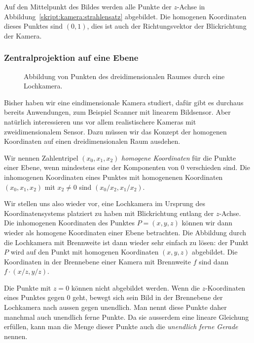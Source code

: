 Auf den Mittelpunkt des Bildes werden alle Punkte der $z$-Achse
in Abbildung~\ref{skript:kamera:strahlensatz} abgebildet.
Die homogenen Koordinaten dieses Punktes sind $(0,1)$, dies ist
auch der Richtungsvektor der Blickrichtung der Kamera.

\subsubsection{Zentralprojektion auf eine Ebene}
\begin{figure}
\centering
\caption{Abbildung von Punkten des dreidimensionalen Raumes durch eine
Lochkamera.
\label{skript:kamera:lochkamera}}
\end{figure}
Bisher haben wir eine eindimensionale Kamera studiert, dafür gibt
es durchaus bereits Anwendungen, zum Beispiel Scanner mit linearem
Bildsensor.
Aber natürlich
interessieren uns vor allem realistischere Kameras mit zweidimensionalem
Sensor.
Dazu müssen wir das Konzept der homogenen Koordinaten auf einen
dreidimensionalen Raum ausdehen.

\begin{definition}
Wir nennen Zahlentripel $(x_0,x_1,x_2)$ {\em homogene Koordinaten}
für die Punkte einer Ebene, wenn mindestens eine der Komponenten von $0$
verschieden sind.
Die inhomogenen Koordinaten eines Punktes mit homogenenen Koordinaten
$(x_0,x_1,x_2)$ mit $x_2\ne 0$ sind $(x_0/x_2,x_1/x_2)$.
\end{definition}

Wir stellen uns also wieder vor, eine Lochkamera im Ursprung des
Koordinatensystems platziert zu haben mit Blickrichtung entlang der
$z$-Achse.
Die inhomogenen Koordinaten des Punktes $P=(x,y,z)$ können wir dann
wieder als homogene Koordinaten einer Ebene betrachten.
Die Abbildung durch die Lochkamera mit Brennweite ist dann wieder sehr
einfach zu lösen: der Punkt $P$ wird auf den Punkt mit homogenen Koordinaten
$(x,y,z)$ abgebildet.
Die Koordinaten in der Brennebene einer Kamera mit Brennweite $f$ sind dann
$f\cdot (x/z, y/z)$.

Die Punkte mit $z=0$ können nicht abgebildet werden.
Wenn die $z$-Koordinaten eines Punktes gegen $0$ geht, bewegt sich sein
Bild in der Brennebene der Lochkamera nach aussen gegen unendlich.
Man nennt diese Punkte daher manchmal auch unendlich ferne Punkte.
Da sie ausserdem eine lineare Gleichung erfüllen, kann man die Menge dieser
Punkte auch die {\em unendlich ferne Gerade} nennen.
%


